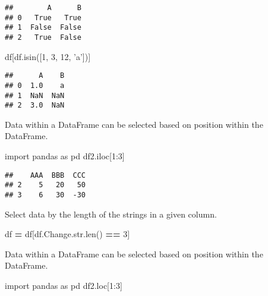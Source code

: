 \documentclass[]{book}
\newenvironment{Shaded}{\begin{snugshade}}{\end{snugshade}}
\newcommand{\BuiltInTok}[1]{#1}
\newcommand{\DecValTok}[1]{\textcolor[rgb]{0.00,0.00,0.81}{#1}}
\newcommand{\ImportTok}[1]{#1}
\newcommand{\NormalTok}[1]{#1}
\newcommand{\OperatorTok}[1]{\textcolor[rgb]{0.81,0.36,0.00}{\textbf{#1}}}
\newcommand{\StringTok}[1]{\textcolor[rgb]{0.31,0.60,0.02}{#1}}
\begin{document}
\begin{verbatim}
##        A      B
## 0   True   True
## 1  False  False
## 2   True  False
\end{verbatim}

\begin{Shaded}
\begin{Highlighting}[]
\NormalTok{df[df.isin([}\DecValTok{1}\NormalTok{, }\DecValTok{3}\NormalTok{, }\DecValTok{12}\NormalTok{, }\StringTok{'a'}\NormalTok{])]}
\end{Highlighting}
\end{Shaded}

\begin{verbatim}
##      A    B
## 0  1.0    a
## 1  NaN  NaN
## 2  3.0  NaN
\end{verbatim}

Data within a DataFrame can be selected based on position within the DataFrame.

\begin{Shaded}
\begin{Highlighting}[]
\ImportTok{import}\NormalTok{ pandas }\ImportTok{as}\NormalTok{ pd}
\NormalTok{df2.iloc[}\DecValTok{1}\NormalTok{:}\DecValTok{3}\NormalTok{]}
\end{Highlighting}
\end{Shaded}

\begin{verbatim}
##    AAA  BBB  CCC
## 2    5   20   50
## 3    6   30  -30
\end{verbatim}

Select data by the length of the strings in a given column.

\begin{Shaded}
\begin{Highlighting}[]
\NormalTok{df }\OperatorTok{=}\NormalTok{ df[df.Change.}\BuiltInTok{str}\NormalTok{.}\BuiltInTok{len}\NormalTok{() }\OperatorTok{==} \DecValTok{3}\NormalTok{]}
\end{Highlighting}
\end{Shaded}

Data within a DataFrame can be selected based on position within the DataFrame.

\begin{Shaded}
\begin{Highlighting}[]
\ImportTok{import}\NormalTok{ pandas }\ImportTok{as}\NormalTok{ pd}
\NormalTok{df2.loc[}\DecValTok{1}\NormalTok{:}\DecValTok{3}\NormalTok{]}
\end{Highlighting}
\end{Shaded}
\end{document}
